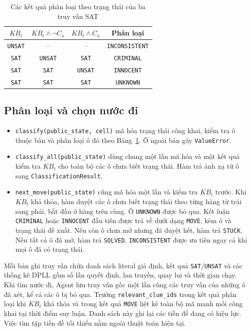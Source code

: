 \begin{table}[htbp]
\centering
\small
\begin{tabular}{cccc}
\toprule
$KB_t$ & $KB_t\land\neg C_x$ & $KB_t\land C_x$ & Phân loại \\
\midrule
\texttt{UNSAT} & -- & -- & \texttt{INCONSISTENT} \\
\texttt{SAT} & \texttt{UNSAT} & \texttt{SAT} & \texttt{CRIMINAL} \\
\texttt{SAT} & \texttt{SAT} & \texttt{UNSAT} & \texttt{INNOCENT} \\
\texttt{SAT} & \texttt{SAT} & \texttt{SAT} & \texttt{UNKNOWN} \\
\bottomrule
\end{tabular}
\caption{Các kết quả phân loại theo trạng thái của ba truy vấn SAT}
\label{tab:agent-classification}
\end{table}

\subsection{Phân loại và chọn nước đi}

\begin{itemize}
    \item \texttt{classify(public\_state, cell)} mã hóa trạng thái công
    khai, kiểm tra ô thuộc bàn và phân loại ô đó theo
    Bảng~\ref{tab:agent-classification}. Ô ngoài bàn gây
    \texttt{ValueError}.
    \item \texttt{classify\_all(public\_state)} dùng chung một lần mã hóa
    và một kết quả kiểm tra $KB_t$ cho toàn bộ các ô chưa biết trạng thái.
    Hàm trả ánh xạ từ ô sang \texttt{ClassificationResult}.
    \item \texttt{next\_move(public\_state)} cũng mã hóa một lần và kiểm tra
    $KB_t$ trước. Khi $KB_t$ khả thỏa, hàm duyệt các ô chưa biết trạng thái
    theo từng hàng từ trái sang phải, bắt đầu ở hàng trên cùng. Ô
    \texttt{UNKNOWN} được bỏ qua. Kết luận \texttt{CRIMINAL} hoặc
    \texttt{INNOCENT} đầu tiên được trả về dưới dạng \texttt{MOVE}, kèm ô và
    trạng thái đề xuất. Nếu còn ô chưa mở nhưng đã duyệt hết, hàm trả
    \texttt{STUCK}. Nếu tất cả ô đã mở, hàm trả \texttt{SOLVED}.
    \texttt{INCONSISTENT} được ưu tiên ngay cả khi mọi ô đã có trạng thái.
\end{itemize}

Mỗi bản ghi truy vấn chứa danh sách literal giả định, kết quả
\texttt{SAT}/\texttt{UNSAT} và các thống kê DPLL gồm số lần quyết định,
lan truyền, quay lui và thời gian chạy. Khi tìm nước đi, Agent lưu truy vấn
gốc một lần cùng các truy vấn của những ô đã xét, kể cả các ô bị bỏ qua.
Trường \texttt{relevant\_clue\_ids} trong kết quả phân loại khi $KB_t$ khả
thỏa và trong kết quả \texttt{MOVE} liệt kê toàn bộ mã manh mối công khai
tại thời điểm suy luận. Danh sách này ghi lại các tiền đề đang có hiệu lực.
Việc tìm tập tiền đề tối thiểu nằm ngoài thuật toán hiện tại.

